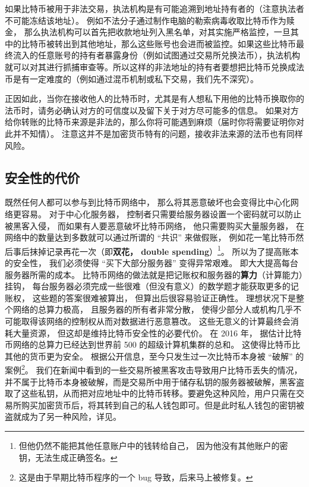 如果比特币被用于非法交易，执法机构是有可能追溯到地址持有者的（注意执法者不可能冻结该地址）。 例如不法分子通过制作电脑的勒索病毒收取比特币作为赎金， 那么执法机构可以首先把收款地址列入黑名单，对其实施严格监控，一旦其中的比特币被转出到其他地址，那么这些账号也会进而被监控。如果这些比特币最终流入的任意账号的持有者暴露身份（例如试图通过交易所兑换法币），执法机构就可以对其进行抓捕审查等。所以这样的非法地址的持有者要想把比特币兑换成法币是有一定难度的（例如通过混币机制或私下交易，我们先不深究）。

正因如此，当你在接收他人的比特币时，尤其是有人想私下用他的比特币换取你的法币时，请务必确认对方的可信度以及留下关于对方尽可能多的信息。 如果对方给你转账的比特币来源是非法的，那么你将可能遇到麻烦（届时你将需要证明你对此并不知情）。 注意这并不是加密货币特有的问题，接收非法来源的法币也有同样风险。

\subsection{安全性的代价}
既然任何人都可以参与到比特币网络中， 那么将其恶意破坏也会变得比中心化网络更容易。 对于中心化服务器， 控制者只需要给服务器设置一个密码就可以防止被黑客入侵， 而如果有人要恶意破坏比特币网络， 他只需要购买大量服务器， 在网络中的数量达到多数就可以通过所谓的 “共识” 来做假账， 例如花一笔比特币然后事后抹掉记录再花一次（即\textbf{双花， double spending}）\footnote{但他仍然不能把其他任意账户中的钱转给自己， 因为他没有其他账户的密钥，无法生成正确签名。}。 所以为了提高账本的安全性， 我们必须使得 “买下大部分服务器” 变得异常艰难。 即大大提高每台服务器所需的成本。 比特币网络的做法就是把记账权和服务器的\textbf{算力}（计算能力）挂钩， 每台服务器必须完成一些很难（但没有意义）的数学题才能获取更多的记账权， 这些题的答案很难被算出， 但算出后很容易验证正确性。 理想状况下是整个网络的总算力极高， 且服务器的所有者非常分散， 使得少部分人或机构几乎不可能取得该网络的控制权从而对数据进行恶意篡改。 这些无意义的计算最终会消耗大量资源， 但这却是维持比特币安全性的必要代价。 在 2016 年， 据估计比特币网络的总算力已经达到世界前 500 的超级计算机集群的总和。 这使得比特币比其他的货币更为安全。 根据公开信息，至今只发生过一次比特币本身被 “破解” 的案例\footnote{这是由于早期比特币程序的一个 bug 导致，后来马上被修复。}。 我们在新闻中看到的一些交易所被黑客攻击导致用户比特币丢失的情况，并不属于比特币本身被破解，而是交易所中用于储存私钥的服务器被破解，黑客盗取了这些私钥，从而把对应地址中的比特币转移。要避免这种风险，用户只需在交易所购买加密货币后，将其转到自己的私人钱包即可。但是此时私人钱包的密钥被盗就成为了另一种风险，详见。


